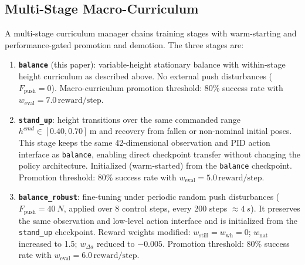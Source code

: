 \documentclass[conference]{IEEEtran}
\begin{document}

\subsection{Multi-Stage Macro-Curriculum}
\label{sec:multi_stage}
A multi-stage curriculum manager chains training stages with
warm-starting and performance-gated promotion and demotion.
The three stages are:

\begin{enumerate}
    \item \textbf{\texttt{balance}} (this paper):
    variable-height stationary balance with within-stage height curriculum
    as described above.
    No external push disturbances ($F_{\mathrm{push}} = 0$).
    Macro-curriculum promotion threshold: 80\% success rate with
    $w_{\mathrm{eval}} = 7.0\,\mathrm{reward/step}$.

    \item \textbf{\texttt{stand\_up}}:
    height transitions over the same commanded range
    $h^{cmd} \in [0.40,0.70]\,\mathrm{m}$ and recovery from
    fallen or non-nominal initial poses.
    This stage keeps the same 42-dimensional observation and PID
    action interface as \texttt{balance}, enabling direct checkpoint
    transfer without changing the policy architecture.
    Initialized (warm-started) from the \texttt{balance} checkpoint.
    Promotion threshold: 80\% success rate with
    $w_{\mathrm{eval}} = 5.0\,\mathrm{reward/step}$.

    \item \textbf{\texttt{balance\_robust}}:
    fine-tuning under periodic random push disturbances
    ($F_{\mathrm{push}} = \SI{40}{N}$, applied over 8 control steps,
    every 200 steps $\approx\SI{4}{s}$).
    It preserves the same observation and low-level action interface
    and is initialized from the \texttt{stand\_up} checkpoint.
    Reward weights modified: $w_{\mathrm{still}} = w_{\mathrm{wh}} = 0$;
    $w_{\mathrm{nat}}$ increased to 1.5;
    $w_{\Delta a}$ reduced to $-0.005$.
    Promotion threshold: 80\% success rate with
    $w_{\mathrm{eval}} = 6.0\,\mathrm{reward/step}$.
\end{enumerate}
\end{document}
